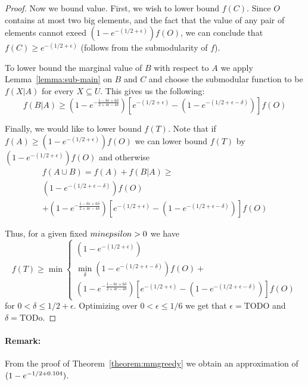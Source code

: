 \begin{proof}
Now we bound value.
First, we wish to lower bound $f(C)$.
Since $O$ contains at most two big elements, and the fact that the value of any pair of elements cannot exeed $(1 - e^{-(1/2 + \epsilon)})f(O)$, we can conclude that $f(C) \geq e^{-(1/2 + \epsilon)}$ (follows from the submodularity of $f$).

To lower bound the marginal value of $B$ with respect to $A$ we apply Lemma~\ref{lemma:sub-main} on $B$ and $C$ and choose the submodular function to be $f(X|A)$ for every $X \subseteq U$.
This gives us the following:
\begin{equation}
	\label{mmgreedy:lower-bound-B-given-A}
	f(B|A) \geq 
	(1-e^{-\frac{1-6\epsilon+6\delta}{2+4\epsilon-4\delta}})
	\left[
	e^{-(1/2 + \epsilon)}
	- (1 - e^{-(1/2 + \epsilon - \delta)})
	\right]f(O)
\end{equation}

Finally, we would like to lower bound $f(T)$.
Note that if $f(A) \geq (1 - e^{-(1/2 + \epsilon)})f(O)$ we can lower bound $f(T)$ by $(1 - e^{-(1/2 + \epsilon)})f(O)$ and otherwise
\begin{multline}
	f(A \cup B)  
	= 
	f(A) + f(B|A) 
	\geq 
	\\
	(1-e^{-(1/2 + \epsilon - \delta)})f(O) 
	\\
	+ 
	(1-e^{-\frac{1-6\epsilon+6\delta}{2+4\epsilon-4\delta}})
	\left[
	e^{-(1/2 + \epsilon)}
	- (1 - e^{-(1/2 + \epsilon - \delta)})
	\right]f(O)
\end{multline} 

Thus, for a given fixed $\\min epsilon > 0$ we have
\begin{equation}
	f(T) \geq \min \begin{cases}
		(1 - e^{-(1/2 + \epsilon)})
		\\
			\displaystyle{\min_{\delta}}
			(1-e^{-(1/2 + \epsilon - \delta)})f(O) 
			+ 
			\\ 
			(1-e^{-\frac{1-6\epsilon+6\delta}{2+4\epsilon-4\delta}})
			\left[
			e^{-(1/2 + \epsilon)}
			- (1 - e^{-(1/2 + \epsilon - \delta)})
			\right]f(O)
	\end{cases}
\end{equation}
for $0 < \delta \leq 1/2 + \epsilon$.
Optimizing over $0 < \epsilon \leq 1/6$ we get that $\epsilon = \text{TODO}$ and $\delta = \text{TODo}$.
\end{proof}

\paragraph{Remark:} From the proof of Theorem~\ref{theorem:mmgreedy} we obtain an approximation of $(1 - e^{-1/2 + 0.104})$.

